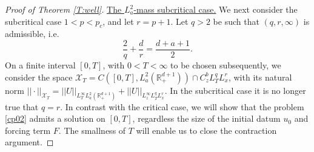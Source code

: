\documentclass[10pt,a4paper]{amsart}
\def \RN {\mathbb{R}_+^{d+1}}
\newcommand{\XT}{\mathcal{X}_T}
\begin{document}
\begin{proof}[Proof of Theorem \ref{T:well}]
\vskip 0.2in 

\noindent \underline{The $L^2_a$-mass subcritical case.} 
We next consider the subcritical case $1<p<p_c$, and let $r = p+1$. Let $q>2$ be such that $(q,r,\infty)$ is admissible, i.e.
\[
\frac 2q +\frac dr = \frac{d+a+1}2.
\]
On a finite interval $[0,T]$, with $0<T<\infty$ to be chosen subsequently, we consider the space $\XT= C([0,T],L^2_a(\RN)) \cap C^{b}_z L^q_T L^r_x$, 
with its natural norm $||\cdot||_{\XT} = ||U||_{L^\infty_T L^2_a(\RN)} + ||U||_{L^\infty_z L^q_TL^r_x }$.
In the subcritical case it is no longer true that $q =r$. In contrast with the critical case, we will show that the problem \eqref{cp02} admits a solution on $[0,T]$, regardless the size of the initial datum $u_0$ and forcing term $F$. The smallness of $T$ will enable us to close the contraction argument. 


\end{proof}
\end{document}
